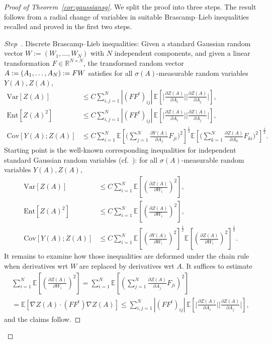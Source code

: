 \documentclass[10pt]{amsart}
\theoremstyle{definition}\newtheorem{defi}[theo]{Definition}\newtheorem{rema}[theo]{Remark}\newtheorem{exam}[theo]{Example}\newtheorem{exem}[theo]{Example}\newtheorem{nota}[theo]{Notation}
\newcommand{\R}{\mathbb R}
\newcommand{\E}{\mathbb{E}}
\newcommand{\expec}[1]{\mathbb{E}\left[#1 \right]}
\newcommand{\var}[1]{\mathrm{Var}\left[#1\right]}
\newcommand{\ent}[1]{\mathrm{Ent}\!\left[#1\right]}
\newcommand{\cov}[2]{\mathrm{Cov}\left[#1;#2\right]}
\newcounter{stepcount}
\newenvironment{step}{\refstepcounter{stepcount}\begin{proof}[Step~\thestepcount]}{\let\qed\relax\end{proof}}
\begin{document}
\begin{proof}[Proof of Theorem~\ref{cor:gaussiansg}]
We split the proof into three steps. The result follows from a radial change of variables in suitable Brascamp--Lieb inequalities recalled and proved in the first two steps.


\setcounter{stepcount}{0}
\begin{step}{Discrete Brascamp--Lieb inequalities:}\label{step1prooftheo3.1}
Given a standard Gaussian random vector $W:=(W_1,\ldots,W_N)$ with $N$ independent components, and given a linear transformation $F\in\R^{N\times N}$, the transformed random vector $A:=(A_1,\ldots,A_N)\linebreak:=FW$ satisfies for all $\sigma(A)$-measurable random variables $Y(A),Z(A)$,
\begin{equation}\label{eq:bl-var-disr}
\begin{aligned}
\var{Z(A)} &\le C\sum_{i,j=1}^N|(FF^t)_{ij}|\,\expec{\Big|\frac{\partial Z(A)}{\partial A_i}\Big|\Big|\frac{\partial Z(A)}{\partial A_j}\Big|},
\\
\ent{Z(A)^2} &\le C\sum_{i,j=1}^N|(FF^t)_{ij}|\,\expec{\Big|\frac{\partial Z(A)}{\partial A_i}\Big|\Big|\frac{\partial Z(A)}{\partial A_j}\Big|},\\
\cov{Y(A)}{Z(A)} &\le  C\sum_{i=1}^N\expec{\Big(\sum_{j=1}^N\frac{\partial{Y(A)}}{\partial A_j}F_{ji}\Big)^2}^\frac12\!\expec{\Big(\sum_{k=1}^N\frac{\partial{Z(A)}}{\partial A_k}F_{ki}\Big)^2}^\frac12.
\end{aligned}
\end{equation}
Starting point is the well-known corresponding inequalities for independent standard Gaussian random variables (cf.~\cite{Gross-75}): for all $\sigma(A)$-measurable random variables $Y(A),Z(A)$,
\begin{align*}
\var{Z(A)} &\le C\sum_{i=1}^N\expec{\left(\frac{\partial Z(A)}{\partial W_i}\right)^2},
\\
\ent{Z(A)^2} &\le C\sum_{i=1}^N\expec{\left(\frac{\partial Z(A)}{\partial W_i}\right)^2},
\\
\cov{Y(A)}{Z(A)} &\le C\sum_{i=1}^N\expec{\left(\frac{\partial{Y(A)}}{\partial W_i}\right)^2}^\frac12\!\expec{\left(\frac{\partial{Z(A)}}{\partial W_i}\right)^2}^\frac12.
\end{align*}
It remains to examine how those inequalities are deformed under the chain rule when derivatives wrt $W$ are replaced by derivatives wrt $A$. It suffices to estimate
\begin{multline*}
\sum_{i=1}^N\expec{\left(\frac{\partial{Z(A)}}{\partial W_i}\right)^2} = \sum_{i=1}^N\E\left[{\left(\sum_{j=1}^N\frac{\partial{Z(A)}}{\partial A_j}F_{ji} \right)^2}\right]\\
=\expec{\nabla Z(A)\cdot (FF^t)\nabla Z(A)} 
\le \sum_{i,j=1}^N|(FF^t)_{ij}|\,\expec{\Big|\frac{\partial{Z(A)}}{\partial A_i}\Big|\Big|\frac{\partial{Z(A)}}{\partial A_j}\Big|},
\end{multline*}
and the claims follow.
\end{step}


\end{proof}
\end{document}
